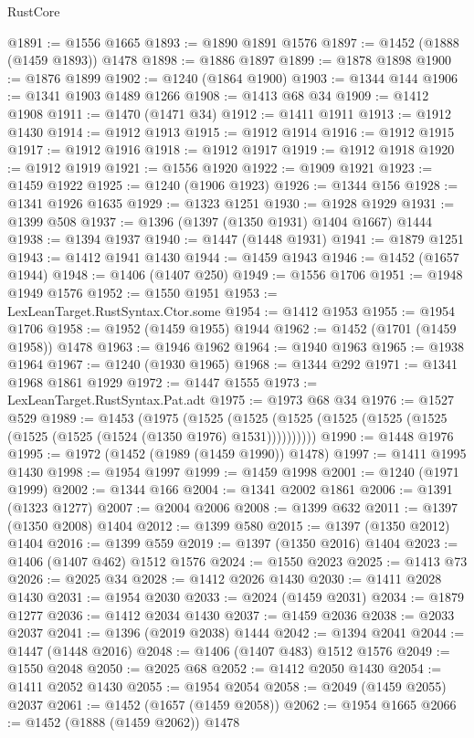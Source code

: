 \begin{lexlean}{RustCore}
\begin{coremodule}
@1891 := @1556 @1665
@1893 := @1890 @1891 @1576
@1897 := @1452 (@1888 (@1459 @1893)) @1478
@1898 := @1886 @1897
@1899 := @1878 @1898
@1900 := @1876 @1899
@1902 := @1240 (@1864 @1900)
@1903 := @1344 @144
@1906 := @1341 @1903 @1489 @1266
@1908 := @1413 @68 @34
@1909 := @1412 @1908
@1911 := @1470 (@1471 @34)
@1912 := @1411 @1911
@1913 := @1912 @1430
@1914 := @1912 @1913
@1915 := @1912 @1914
@1916 := @1912 @1915
@1917 := @1912 @1916
@1918 := @1912 @1917
@1919 := @1912 @1918
@1920 := @1912 @1919
@1921 := @1556 @1920
@1922 := @1909 @1921
@1923 := @1459 @1922
@1925 := @1240 (@1906 @1923)
@1926 := @1344 @156
@1928 := @1341 @1926 @1635
@1929 := @1323 @1251
@1930 := @1928 @1929
@1931 := @1399 @508
@1937 := @1396 (@1397 (@1350 @1931) @1404 @1667) @1444
@1938 := @1394 @1937
@1940 := @1447 (@1448 @1931)
@1941 := @1879 @1251
@1943 := @1412 @1941 @1430
@1944 := @1459 @1943
@1946 := @1452 (@1657 @1944)
@1948 := @1406 (@1407 @250)
@1949 := @1556 @1706
@1951 := @1948 @1949 @1576
@1952 := @1550 @1951
@1953 := LexLeanTarget.RustSyntax.Ctor.some
@1954 := @1412 @1953
@1955 := @1954 @1706
@1958 := @1952 (@1459 @1955) @1944
@1962 := @1452 (@1701 (@1459 @1958)) @1478
@1963 := @1946 @1962
@1964 := @1940 @1963
@1965 := @1938 @1964
@1967 := @1240 (@1930 @1965)
@1968 := @1344 @292
@1971 := @1341 @1968 @1861 @1929
@1972 := @1447 @1555
@1973 := LexLeanTarget.RustSyntax.Pat.adt
@1975 := @1973 @68 @34
@1976 := @1527 @529
@1989 := @1453
    (@1975
      (@1525 (@1525 (@1525 (@1525 (@1525 (@1525 (@1525 (@1525 (@1524 (@1350 @1976) @1531))))))))))
@1990 := @1448 @1976
@1995 := @1972 (@1452 (@1989 (@1459 @1990)) @1478)
@1997 := @1411 @1995 @1430
@1998 := @1954 @1997
@1999 := @1459 @1998
@2001 := @1240 (@1971 @1999)
@2002 := @1344 @166
@2004 := @1341 @2002 @1861
@2006 := @1391 (@1323 @1277)
@2007 := @2004 @2006
@2008 := @1399 @632
@2011 := @1397 (@1350 @2008) @1404
@2012 := @1399 @580
@2015 := @1397 (@1350 @2012) @1404
@2016 := @1399 @559
@2019 := @1397 (@1350 @2016) @1404
@2023 := @1406 (@1407 @462) @1512 @1576
@2024 := @1550 @2023
@2025 := @1413 @73
@2026 := @2025 @34
@2028 := @1412 @2026 @1430
@2030 := @1411 @2028 @1430
@2031 := @1954 @2030
@2033 := @2024 (@1459 @2031)
@2034 := @1879 @1277
@2036 := @1412 @2034 @1430
@2037 := @1459 @2036
@2038 := @2033 @2037
@2041 := @1396 (@2019 @2038) @1444
@2042 := @1394 @2041
@2044 := @1447 (@1448 @2016)
@2048 := @1406 (@1407 @483) @1512 @1576
@2049 := @1550 @2048
@2050 := @2025 @68
@2052 := @1412 @2050 @1430
@2054 := @1411 @2052 @1430
@2055 := @1954 @2054
@2058 := @2049 (@1459 @2055) @2037
@2061 := @1452 (@1657 (@1459 @2058))
@2062 := @1954 @1665
@2066 := @1452 (@1888 (@1459 @2062)) @1478

\end{coremodule}
\end{lexlean}
